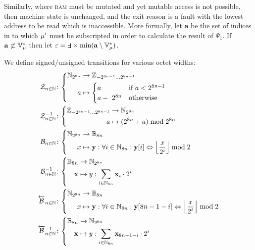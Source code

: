 Similarly, where \textsc{ram} must be mutated and yet mutable access is not possible, then machine state is unchanged, and the exit reason is a fault with the lowest address to be read which is inaccessible. More formally, let $\mathbf{a}$ be the set of indices in to which ${\mu}'$ must be subscripted in order to calculate the result of $\Psi_1$. If $\mathbf{a} \not\subset \mathbb{V}^*_{\mu}$ then let $\varepsilon=\fault \times \text{min}(\mathbf{a} \setminus \mathbb{V}^*_\mem)$.

We define signed/unsigned transitions for various octet widths:
\begin{align}
  \label{eq:signedfunc}
  \signfunc{n \in \N}&\colon\left\{\begin{aligned}
    \N_{2^{8n}} &\to \Z_{-2^{8n-1}\dots2^{8n-1}}\\
    a &\mapsto \begin{cases}
      a &\when a < 2^{8n-1} \\
      a -\ 2^{8n} &\otherwise
    \end{cases}
  \end{aligned}\right.\\
  \unsignfunc{n \in \N}&\colon\left\{\begin{aligned}
    \Z_{-2^{8n-1}\dots2^{8n-1}} &\to \N_{2^{8n}}\\
    a &\mapsto (2^{8n} + a) \bmod 2^{8n}
  \end{aligned}\right.\\
  \label{eq:bitsfunc}
  \bitsfunc{n\in\N}&\colon\left\{\begin{aligned}
    \N_{2^{8n}} &\to \mathbb{B}_{8n}\\
    x &\mapsto \mathbf{y}: \forall i \in \N_{8n} : \mathbf{y}[i] \Leftrightarrow \ffrac{x}{2^i}\bmod 2
  \end{aligned}\right.\\
  \unbitsfunc{n\in\N}&\colon\left\{\begin{aligned}
    \mathbb{B}_{8n} &\to \N_{2^{8n}}\\
    \mathbf{x} &\mapsto y: \sum_{i \in \N_{8n}} \mathbf{x}_i \cdot 2^i
  \end{aligned}\right.\\
  \label{eq:revbitsfunc}
  \revbitsfunc{n\in\N}&\colon\left\{\begin{aligned}
    \N_{2^{8n}} &\to \mathbb{B}_{8n}\\
    x &\mapsto \mathbf{y}: \forall i \in \N_{8n} : \mathbf{y}[8n - 1 - i] \Leftrightarrow \ffrac{x}{2^i}\bmod 2
  \end{aligned}\right.\\
  \revunbitsfunc{n\in\N}&\colon\left\{\begin{aligned}
    \mathbb{B}_{8n} &\to \N_{2^{8n}}\\
    \mathbf{x} &\mapsto y: \sum_{i \in \N_{8n}} \mathbf{x}_{8n - 1 - i} \cdot 2^i
  \end{aligned}\right.
\end{align}

